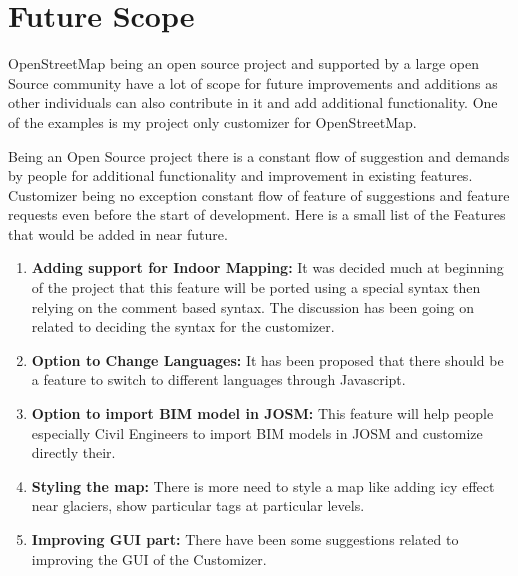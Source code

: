 
\section{Future Scope}
OpenStreetMap being an open source project and supported by a large open Source community have a lot of scope for future improvements and additions as other individuals can also contribute in it and add additional functionality. One of the examples is my project only customizer for OpenStreetMap.

Being an Open Source project there is a constant flow of suggestion and demands by people for additional functionality and improvement in existing features.
Customizer being no exception constant flow of feature of suggestions and feature requests even before the start of development. Here is a small list of the Features that would be added in near future.

\begin{enumerate}

\item \textbf{Adding support for Indoor Mapping:} It was decided much at beginning of the project that this feature will be ported using a special syntax then relying on the comment based syntax. The discussion has been going on related to deciding the syntax for the customizer.

\item \textbf{Option to Change Languages:} It has been proposed that there should be a feature to switch to different languages through Javascript.

\item \textbf{Option to import BIM model in JOSM:} This feature will help people especially Civil Engineers to import BIM models in JOSM and customize directly their.

\item \textbf{Styling the map:} There is more need to style a map like adding icy effect near glaciers, show particular tags at particular levels.

\item \textbf{Improving GUI part:} There have been some suggestions related to improving the GUI of the Customizer.
\end{enumerate}

